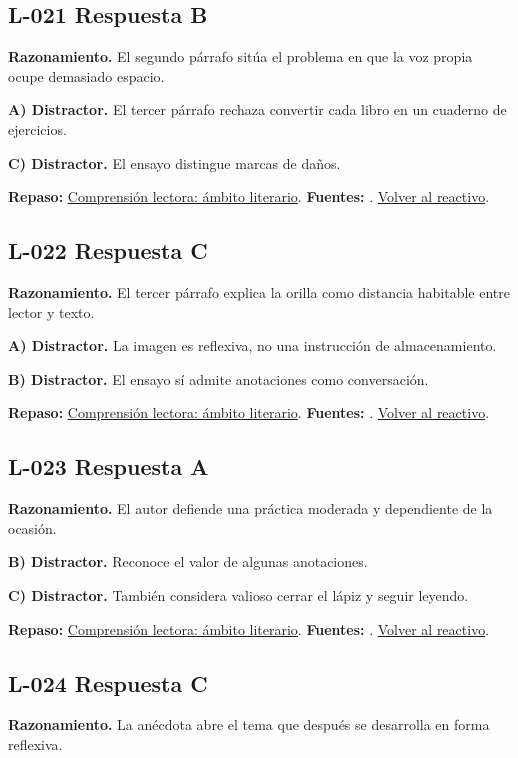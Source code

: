 \subsection*{L-021 \quad Respuesta B}\label{s:L-021}
\textbf{Razonamiento.} El segundo párrafo sitúa el problema en que la voz propia ocupe demasiado espacio.

\textbf{A) Distractor. }El tercer párrafo rechaza convertir cada libro en un cuaderno de ejercicios.

\textbf{C) Distractor. }El ensayo distingue marcas de daños.

\textbf{Repaso:} \hyperref[sec:l2]{Comprensión lectora: ámbito literario}. \textbf{Fuentes:} \cite{ceneval,reading}. \hyperref[q:L-021]{Volver al reactivo}.\par\medskip

\subsection*{L-022 \quad Respuesta C}\label{s:L-022}
\textbf{Razonamiento.} El tercer párrafo explica la orilla como distancia habitable entre lector y texto.

\textbf{A) Distractor. }La imagen es reflexiva, no una instrucción de almacenamiento.

\textbf{B) Distractor. }El ensayo sí admite anotaciones como conversación.

\textbf{Repaso:} \hyperref[sec:l2]{Comprensión lectora: ámbito literario}. \textbf{Fuentes:} \cite{ceneval,reading}. \hyperref[q:L-022]{Volver al reactivo}.\par\medskip

\subsection*{L-023 \quad Respuesta A}\label{s:L-023}
\textbf{Razonamiento.} El autor defiende una práctica moderada y dependiente de la ocasión.

\textbf{B) Distractor. }Reconoce el valor de algunas anotaciones.

\textbf{C) Distractor. }También considera valioso cerrar el lápiz y seguir leyendo.

\textbf{Repaso:} \hyperref[sec:l2]{Comprensión lectora: ámbito literario}. \textbf{Fuentes:} \cite{ceneval,reading}. \hyperref[q:L-023]{Volver al reactivo}.\par\medskip

\subsection*{L-024 \quad Respuesta C}\label{s:L-024}
\textbf{Razonamiento.} La anécdota abre el tema que después se desarrolla en forma reflexiva.

